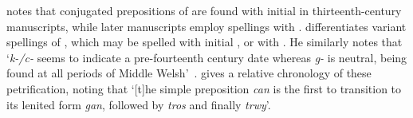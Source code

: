 \Textcite[52]{jongeleen_lenition_2016} notes that conjugated prepositions of  are found with initial   in thirteenth-century manuscripts, while later manuscripts employ spellings with .
\Textcite{sims-williams_variation_2013} differentiates variant spellings of , which may be spelled with initial , or with .
He similarly notes that `\textit{k-/c-} seems to indicate a pre-fourteenth century date whereas \textit{g-} is neutral, being found at all periods of Middle Welsh'~\autocite[24]{sims-williams_variation_2013}. \Textcite[55]{jongeleen_lenition_2016} gives a relative chronology of these petrification, noting that `[t]he simple preposition \textit{can} is the first to transition to its lenited form \textit{gan}, followed by \textit{tros} and finally \textit{trwy}'.

